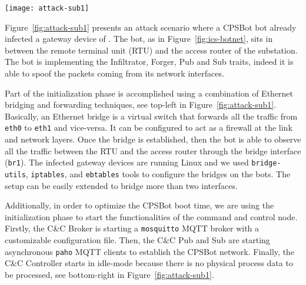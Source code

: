 \documentclass[sigconf]{acmart}
\makeatletter
\newcommand{\tcircle}[1]{\raisebox{.5pt}{\textcolor{SUTDred}{\textcircled{\raisebox{-.9pt} {#1}}}}}
\newcommand{\Botnet}{CPSBot\@\xspace}
\newcommand{\CC}{C\&C\@\xspace}
\makeatother
\begin{document}
\begin{figure*}[tb]
    \centering
    \texttt{[image: attack-sub1]}
    \caption{A \Botnet-based attack on the \wadilong.  Grey/black
      lines and boxes represent the ICS/\Botnet links and devices.  In the
      initialization phase, the bot is bridging between the RTU and
      the router, and the \CC starts the Broker process and the Pub
      and Sub clients  \tcircle{1}. In the distributed impersonation
      phase the bot disconnects the RTU from the network and start
      impersonating it by answering to the SCADA \texttt{requests}
      using the \texttt{responses} produced by the \CC Controller
      \tcircle{2}.  The same phases take place on the other substations at
      the same time. Once the botmaster impersonates all the RTUs then
      she can target the real ones \tcircle{3}.  }
    \label{fig:attack-sub1}
\end{figure*}

Figure~\ref{fig:attack-sub1} presents an attack scenario where a \Botnet bot
already infected a gateway device of \wadi. The bot,
as in Figure~\ref{fig:ics-botnet}, sits in between the remote terminal unit
(RTU) and the access router of the substation. The bot is implementing the
Infiltrator, Forger, Pub and Sub traits, indeed it is able to spoof the
packets coming from its network interfaces.

Part of the initialization phase is accomplished using a combination
of Ethernet bridging and forwarding techniques, see top-left \tcircle{1}
in Figure~\ref{fig:attack-sub1}.
Basically, an Ethernet bridge is a virtual switch that forwards all the
traffic from \texttt{eth0} to \texttt{eth1} and vice-versa. It can
be configured to act as a firewall at the link and network layers.
Once the bridge is established, then the bot is
able to observe all the traffic between the RTU and the access router through
the bridge interface (\texttt{br1}). The infected gateway devices are running
Linux and we used \texttt{bridge-utils}, \texttt{iptables},
and \texttt{ebtables} tools to configure the bridges on the bots. The
setup can be easily extended to bridge more than two interfaces.

Additionally, in order to optimize the \Botnet boot time, we are using the initialization
phase to start the functionalities of the command and control node.
Firstly, the \CC Broker is starting a \texttt{mosquitto} MQTT broker with a
customizable configuration file.
Then, the \CC Pub and Sub are starting asynchronous \texttt{paho}
MQTT clients to establish the \Botnet network. Finally, the \CC Controller starts
in idle-mode because there is no physical process data to be processed, see
bottom-right \tcircle{1} in Figure~\ref{fig:attack-sub1}.
\end{document}
